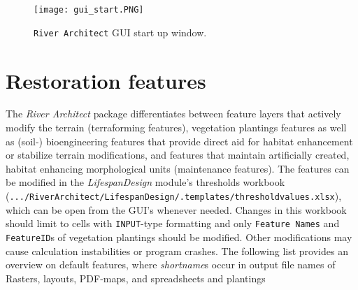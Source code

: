 \begin{figure}[!hbt]
	\begin{center}
	\texttt{[image: gui\_start.PNG]} %
	\caption{\texttt{River Architect} GUI start up window. \label{fig:gui_start}}
	\end{center}
\end{figure}

\section{Restoration features}\label{sec:featoverview}
The \textit{River Architect} package differentiates between feature layers that actively modify the terrain (terraforming features), vegetation plantings features as well as (soil-) bioengineering features that provide direct aid for habitat enhancement or stabilize terrain modifications, and features that maintain artificially created, habitat enhancing morphological units (maintenance features). The features can be modified in the \textit{LifespanDesign} module's thresholds workbook (\texttt{.../RiverArchitect/LifespanDesign/.templates/threshold{\myUnderscore}values.xlsx}), which can be open from the GUI's whenever needed. Changes in this workbook should limit to cells with \texttt{INPUT}-type formatting and only \texttt{Feature Names} and \texttt{FeatureID}s of vegetation plantings should be modified. Other modifications may cause calculation instabilities or program crashes. The following list provides an overview on default features, where \textit{shortname}s occur in output file names of Rasters, layouts, PDF-maps, and spreadsheets and plantings 


